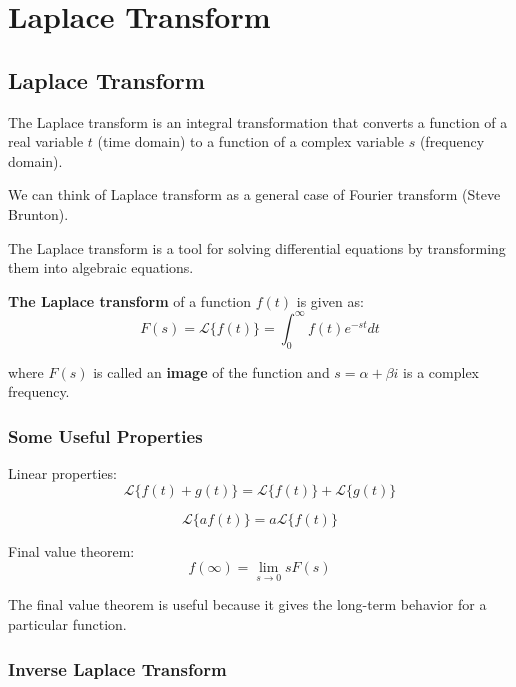 \section{Laplace Transform}

\subsection{Laplace Transform}

The Laplace transform is an integral transformation that converts a function of a real variable \(t\) (time domain) to a function of a complex variable \(s\) (frequency domain). 

We can think of Laplace transform as a general case of Fourier transform (Steve Brunton).

The Laplace transform is a tool for solving differential equations by transforming them into algebraic equations.

\textbf{The Laplace transform }of a function \(f(t)\) is given as:
\begin{equation}
    F(s) = \mathcal{L} \{ f(t)\} = \int_0^\infty f(t) e^{-st}dt
\end{equation}

where \(F(s)\) is called an \textbf{image} of the function and \(s=\alpha +\beta i \) is a complex frequency.

\subsubsection{Some Useful Properties}

Linear properties:
\begin{equation}
    {\mathcal {L}}\{f(t)+g(t)\}={\mathcal {L}}\{f(t)\}+{\mathcal {L}}\{g(t)\}
\end{equation}

\begin{equation}
    {\mathcal {L}}\{af(t)\}=a{\mathcal {L}}\{f(t)\}
\end{equation}

Final value theorem:
\begin{equation}
    f(\infty )=\lim _{s\to 0}{sF(s)}
\end{equation}

The final value theorem is useful because it gives the long-term behavior for a particular function.

\subsubsection{Inverse Laplace Transform}

